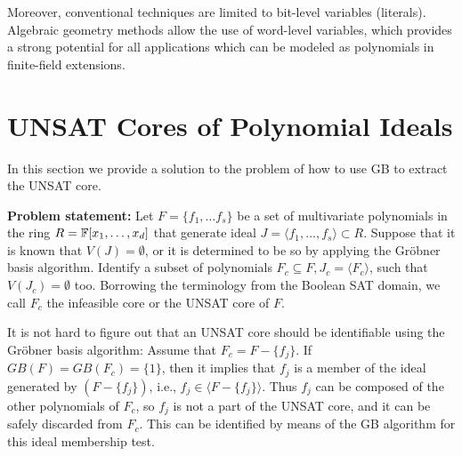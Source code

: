 Moreover, conventional techniques are limited to bit-level variables (literals). Algebraic geometry methods
allow the use of word-level variables, which provides a strong potential for all applications which can be
modeled as polynomials in finite-field extensions.

\section{UNSAT Cores of Polynomial Ideals}
\label{sec:core}
In this section we provide a solution to the problem of how to use 
GB to extract the UNSAT core. 

\textbf{Problem statement: }
Let $F = \{f_1, \dots f_s\}$ be a set of multivariate polynomials in
the ring $R = {\mathbb{F}}[x_1,\dots,x_d]$ that generate ideal $J = \langle
f_1,\dots,f_s\rangle \subset R$. Suppose that it is known that $V(J) =
\emptyset$, or it is determined to be so by applying the Gr\"obner
basis algorithm. Identify a subset of polynomials $F_c \subseteq F,
J_c = \langle F_c \rangle$, such that $V(J_c) = \emptyset$
too. Borrowing the terminology from the Boolean SAT domain, we
call $F_c$ the infeasible core or the UNSAT core of $F$. 


It is not hard to figure out that an UNSAT core should be identifiable
using the Gr\"obner basis algorithm: Assume that $F_c=F-\{f_j\}$. If
$GB(F) = GB(F_c) = \{1\}$, then it implies that $f_j$ is a member of
the ideal generated by $(F - \{f_j\})$, i.e., $f_j \in \langle F -
\{f_j\}\rangle$. Thus $f_j$ can be composed of the other
polynomials of $F_c$, so $f_j$ is  not a part of the UNSAT core, and
it can be safely discarded from $F_c$. This can be identified by means
of the GB algorithm for this ideal membership test.%

